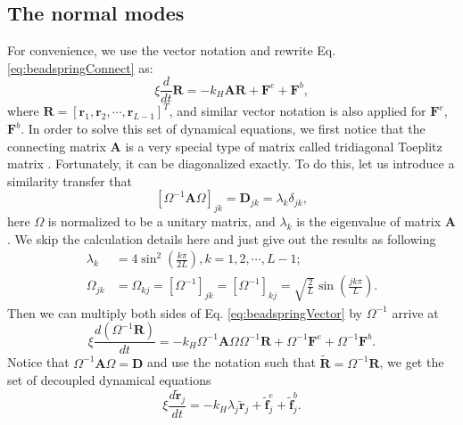 \subsection{The normal modes}
\label{sub:the_normal_modes}
For convenience, we use the vector notation and rewrite Eq. \eqref{eq:beadspringConnect} as:
\begin{equation}
    \label{eq:beadspringVector}
    \xi \frac{d }{dt} \mathbf{R} = - k_H \mathbf{A} \mathbf{R} + \mathbf{F}^e + \mathbf{F}^b,
\end{equation}
where $\mathbf{R} = \left[\mathbf r_1, \mathbf r_2, \cdots, \mathbf r_{L-1}\right]^T$, and similar vector notation is also applied for $\mathbf{F}^e$, $\mathbf{F}^b$. In order to solve this set of dynamical equations, we first notice that the connecting matrix $\mathbf{A}$ is a very special type of matrix called tridiagonal Toeplitz matrix \cite{meyer2000}. Fortunately, it can be diagonalized exactly. To do this, let us introduce a similarity transfer that
\begin{equation}
    \label{eq:similarityTransfer}
    \left[\Omega^{-1} \mathbf{A} \Omega\right]_{jk} = \mathbf{D}_{jk} = \lambda_k\delta_{jk},
\end{equation}
here $\Omega$ is normalized to be a unitary matrix, and $\lambda_k$ is the eigenvalue of matrix $\mathbf A$. We skip the calculation details here and just give out the results as following
\begin{subequations}
    \begin{align}
    \lambda_k  & =  4\sin^2\left(\frac{k\pi}{2 L}\right), k = 1, 2, \cdots, L-1; \\
    \Omega_{jk} & =  \Omega_{kj} = [\Omega^{-1}]_{jk} = [\Omega^{-1}]_{kj} = \sqrt{\frac{2}{L}}\sin\left(\frac{jk\pi}{L}\right).
    \end{align}
\end{subequations}
Then we can multiply both sides of Eq. \eqref{eq:beadspringVector} by $\Omega^{-1}$ arrive at
\begin{equation}
    \label{eq:beadVectorTransfer}
    \xi\frac{d(\Omega^{-1}\mathbf{R})}{dt} = 
    -k_{H}\Omega^{-1} \mathbf{A}\Omega\Omega^{-1} \mathbf{R} + \Omega^{-1}\mathbf{F}^e + \Omega^{-1}\mathbf{F}^b.
\end{equation}
Notice that $\Omega^{-1}\mathbf{A}\Omega = \mathbf{D}$ and use the notation such that $\tilde{\mathbf{R}} = \Omega^{-1} \mathbf{R}$, we get the set of decoupled dynamical equations
\begin{equation}
    \label{eq:decoupledBead}
    \xi\frac{d\tilde{\mathbf{r}}_j}{dt} = -k_{H} \lambda_j \tilde{\mathbf{r}}_j + \tilde{\mathbf{f}}^e_j + \tilde{\mathbf{f}}^b_j.
\end{equation}

